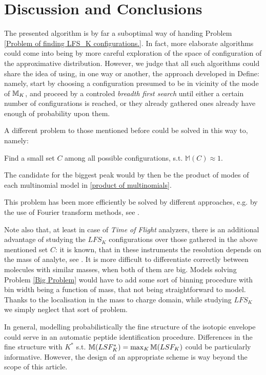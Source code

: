 \section{Discussion and Conclusions}

	The presented algorithm is by far a suboptimal way of handing Problem \ref{Problem of finding LFS_K configurations.}. In fact, more elaborate algorithms could come into being by more careful exploration of the space of configuration of the approximative distribution. However, we judge that all such algorithms could share the idea of using, in one way or another, the approach developed in {\sc Define}: namely, start by choosing a configuration presumed to be in vicinity of the mode of $\mathbb{M}_K$, and proceed by a controled {\it breadth first search} until either a certain number of configurations is reached, or they already gathered ones already have enough of probability upon them.

	A different problem to those mentioned before could be solved in this way to, namely:  

	\begin{Problem}\label{Big Problem}
		Find a small set $C$ among all possible configurations, s.t. $\mathbb{M}(C) \approx 1$.
	\end{Problem}

	The candidate for the biggest peak would by then be the product of modes of each multinomial model in \eqref{product of multinomials}.

	This problem has been more efficiently be solved by different approaches, e.g. by the use of Fourier transform methods, see . 


	Note also that, at least in case of {\it Time of Flight} analyzers, there is an additional advantage of studying the $LFS_K$ configurations over those gathered in the above mentioned set $C$: it is known, that in these instruments the resolution depends on the mass of analyte, see \cite{Eidhammer2008ComputationalMethodsInMassSpectrometry}. It is more difficult to differentiate correctly between molecules with similar masses, when both of them are big. Models solving Problem \ref{Big Problem} would have to add some sort of binning procedure with bin width being a function of mass, that not being straightforward to model. Thanks to the localisation in the mass to charge domain, while studying $LFS_K$ we simply neglect that sort of problem.

	In general, modelling probabilistically the fine structure of the isotopic envelope could serve in an automatic peptide identification procedure. Differences in the fine structure with $K^*$ s.t. $\mathbb{M}(LSF_K^*) = \max_K \mathbb{M}(LSF_K)$ could be particularly informative. However, the design of an appropriate scheme is way beyond the scope of this article.

